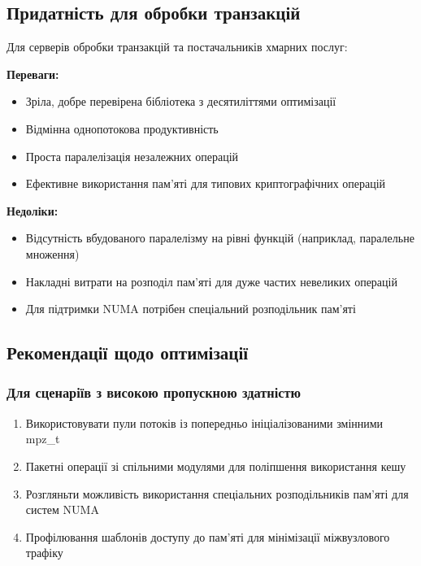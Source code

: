 \subsection{Придатність для обробки транзакцій}
Для серверів обробки транзакцій та постачальників хмарних послуг:

\textbf{Переваги:}
\begin{itemize}
    \item Зріла, добре перевірена бібліотека з десятиліттями оптимізації
    \item Відмінна однопотокова продуктивність
    \item Проста паралелізація незалежних операцій
    \item Ефективне використання пам'яті для типових криптографічних операцій
\end{itemize}

\textbf{Недоліки:}
\begin{itemize}
    \item Відсутність вбудованого паралелізму на рівні функцій (наприклад, паралельне множення)
    \item Накладні витрати на розподіл пам'яті для дуже частих невеликих операцій
    \item Для підтримки NUMA потрібен спеціальний розподільник пам'яті
\end{itemize}

\subsection{Рекомендації щодо оптимізації}

\subsubsection{Для сценаріїв з високою пропускною здатністю}
\begin{enumerate}
    \item Використовувати пули потоків із попередньо ініціалізованими змінними mpz\_t
    \item Пакетні операції зі спільними модулями для поліпшення використання кешу
    \item Розгляньти можливість використання спеціальних розподільників пам'яті для систем NUMA
    \item Профілювання шаблонів доступу до пам'яті для мінімізації міжвузлового трафіку
\end{enumerate}

